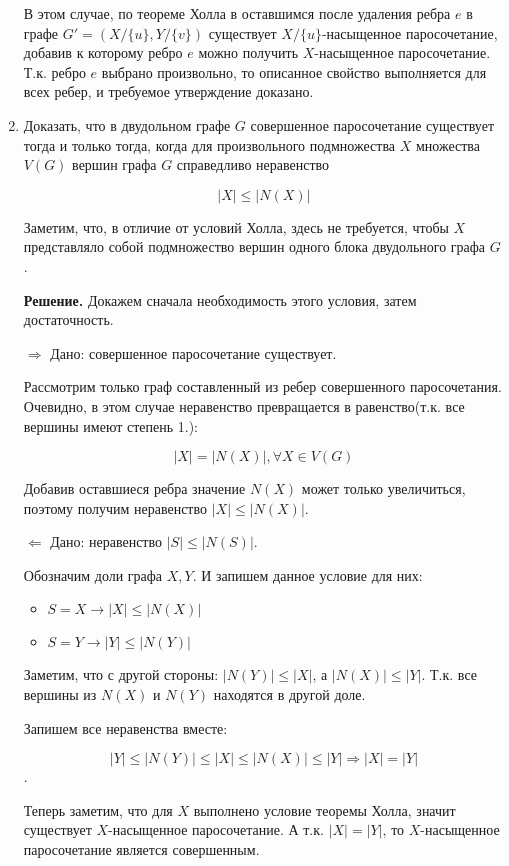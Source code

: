 \documentclass[fleqn]{article}
\begin{document}
\begin{enumerate}
	В этом случае, по теореме Холла в оставшимся после удаления ребра $e$ в графе $G' = (X / \{u\}, Y / \{v\})$ существует $X / \{u\}$-насыщенное паросочетание, добавив к которому ребро $e$ можно получить $X$-насыщенное паросочетание. Т.к. ребро $e$ выбрано произвольно, то описанное свойство выполняется для всех ребер, и требуемое утверждение доказано.
	
	\item Доказать, что в двудольном графе $G$ совершенное паросочетание существует тогда и только тогда,
	когда для произвольного подмножества $X$ множества $V(G)$ вершин графа $G$ справедливо неравенство
	
	$$|X| \leqslant |N(X)|$$
	
	Заметим, что, в отличие от условий Холла, здесь не требуется, чтобы $X$ представляло собой
	подмножество вершин одного блока двудольного графа $G$.
	
	\textbf{Решение.}
	Докажем сначала необходимость этого условия, затем достаточность.
	
	$\Rightarrow$ Дано: совершенное паросочетание существует.
	
	Рассмотрим только граф составленный из ребер совершенного паросочетания. Очевидно, в этом случае неравенство превращается в равенство(т.к. все вершины имеют степень 1.): 
	
	$$|X| = |N(X)|, \forall X \in V(G)$$ 
	
	Добавив оставшиеся ребра значение $N(X)$ может только увеличиться, поэтому получим неравенство $|X| \leqslant |N(X)|$.
	
	$\Leftarrow$ Дано: неравенство $|S| \leqslant |N(S)|$.
	
	Обозначим доли графа $X,Y$. И запишем данное условие для них:
	
	\begin{itemize}
		\item $S = X \rightarrow |X| \leqslant |N(X)|$
		\item $S = Y \rightarrow |Y| \leqslant |N(Y)|$
	\end{itemize}
	
	Заметим, что с другой стороны: $|N(Y)| \leqslant |X|$, а $|N(X)| \leqslant |Y|$. Т.к. все вершины из $N(X)$ и $N(Y)$ находятся в другой доле.
	
	Запишем все неравенства вместе:
	
	$$|Y| \leqslant |N(Y)| \leqslant |X| \leqslant |N(X)| \leqslant |Y| \Rightarrow |X| = |Y|$$.

	Теперь заметим, что для $X$ выполнено условие теоремы Холла, значит существует $X$-насыщенное паросочетание. А т.к. $|X| = |Y|$, то $X$-насыщенное паросочетание является совершенным.
	\end{enumerate}
	
	
\end{document}
